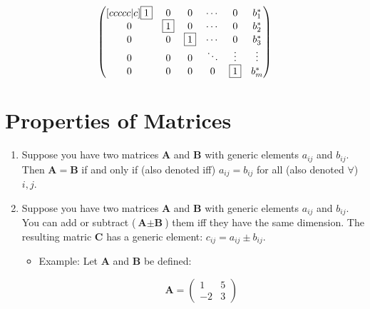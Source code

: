 \documentclass[11pt]{article}
\theoremstyle{definition}
\theoremstyle{remark}
\begin{document}
\begin{itemize}
$$
\begin{pmatrix}[ccccc|c]
\fbox{$1$}&0 & 0 &\cdots & 0 & b^{*}_1 \\
0 & \fbox{$1$} & 0 & \cdots & 0 & b^{*}_2 \\
0 & 0 & \fbox{$1$} & \cdots & 0 & b^{*}_3 \\
0 & 0 & 0 & \ddots & \vdots & \vdots \\
0 & 0 & 0 & 0 & \fbox{$1$} & b^{*}_m \\
\end{pmatrix}
$$
\end{itemize}

\section{Properties of Matrices}
\begin{enumerate}
\item Suppose you have two matrices \textbf{A} and \textbf{B} with generic elements $a_{ij}$ and $b_{ij}$. Then $\mathbf{A}=\mathbf{B}$ if and only if (also denoted iff) $a_{ij}=b_{ij}$ for all (also denoted $\forall$) $i, j$.
\item Suppose you have two matrices \textbf{A} and \textbf{B} with generic elements $a_{ij}$ and $b_{ij}$. You can add or subtract ($\textbf{A} \pm \textbf{B}$) them iff they have the same dimension. The resulting matric \textbf{C} has a generic element: $c_{ij} = a_{ij} \pm b_{ij}$.
\begin{itemize}
\item Example: Let \textbf{A} and \textbf{B} be defined:

$$
\textbf{A} =
\begin{pmatrix}
1&5\\
-2&3
\end{pmatrix}
$$


\end{itemize}
\end{enumerate}
\end{document}
